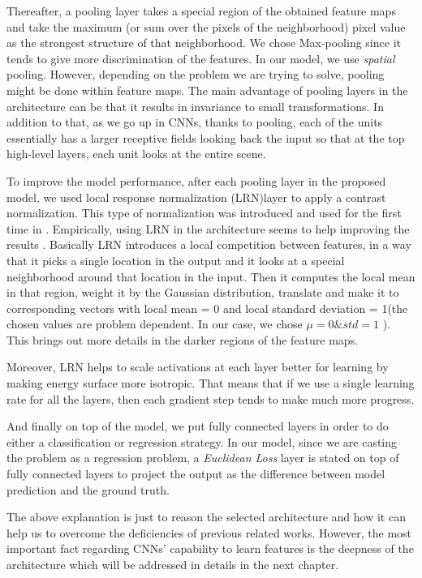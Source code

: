 \indent Thereafter, a pooling layer takes a special region of the obtained feature maps and take the maximum (or sum over the pixels of the neighborhood) pixel value as the strongest structure of that neighborhood. We chose Max-pooling since it tends to give more discrimination of the features\cite{boureau2010theoretical}. In our model, we use \textit{spatial} pooling. However, depending on the problem we are trying to solve, pooling might be done within feature maps\cite{goodfellow2013maxout}.  The main advantage of pooling layers in the architecture can be that it results in invariance to small transformations. In addition to that, as we go up in CNNs, thanks to pooling, each of the units essentially has a larger receptive fields looking back the input so that at the top high-level layers, each unit looks at the entire scene.  

To improve the model performance, after each pooling layer in the proposed model, we used local response normalization (LRN)layer to apply a contrast normalization. This type of normalization was introduced and used for the first time in \cite{krizhevsky2012imagenet}. Empirically, using LRN in the architecture seems to help improving the results \cite{jarrett2009best, krizhevsky2012imagenet}. Basically LRN introduces a local competition between features, in a way that it picks a single location in the output and it looks at a special neighborhood around that location in the input. Then it computes the local mean in that region, weight it by the Gaussian distribution, translate and make it to corresponding vectors with local mean = 0 and local standard deviation = 1(the chosen values are problem dependent. In our case, we chose $\mu = 0 \& std = 1 $ ). This brings out more details in the darker regions of the feature maps. 

\indent Moreover, LRN helps to scale activations at each layer better for learning by making energy surface more isotropic. That means that if we use a single learning rate for all the layers, then each gradient step tends to make much more progress\cite{jarrett2009best}. 

And finally on top of the model, we put fully connected layers in order to do either a classification or regression strategy. In our model, since we are casting the problem as a regression problem, a \textit{Euclidean Loss} layer is stated on top of fully connected layers to project the output as the difference between model prediction and the ground truth. 

The above explanation is just to reason the selected architecture and how it can help us to overcome the deficiencies of previous related works. However, the most important fact regarding CNNs' capability to learn features is the deepness of the architecture which will be addressed in details in the next chapter.  


